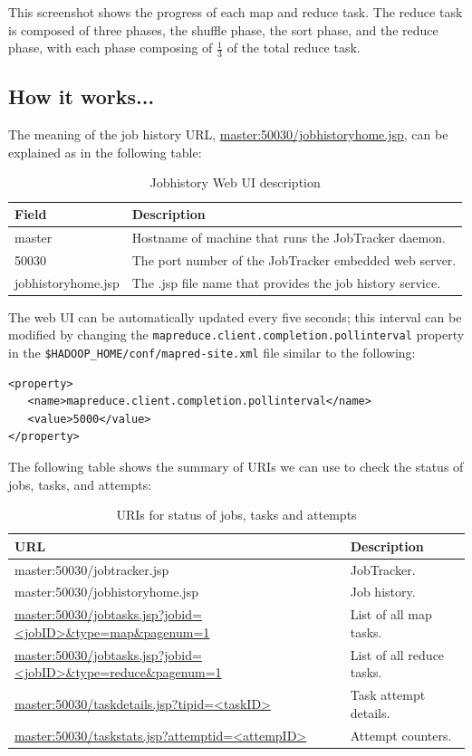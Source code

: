 This screenshot shows the progress of each map and reduce task. The reduce task is composed of three phases, the shuffle phase, the sort phase, and the reduce phase, with each phase composing of $\frac{1}{3}$ of the total reduce task.

\subsection*{How it works...}
The meaning of the job history URL, \url{master:50030/jobhistoryhome.jsp}, can be explained as in the following table:
\begin{table}
  \centering
  \begin{tabular}{ll}
    \toprule 
    \textbf{Field} & \textbf{Description} \\  \midrule
    master & Hostname of machine that runs the JobTracker daemon. \\
    50030 & The port number of the JobTracker embedded web server. \\
    jobhistoryhome.jsp & The .jsp file name that provides the job history service. \\ \bottomrule
  \end{tabular}
  \caption{Jobhistory Web UI description}\label{tbl:jobhistory}
\end{table}

The web UI can be automatically updated every five seconds; this interval can be modified by changing the \verb|mapreduce.client.completion.pollinterval| property in the \verb|$HADOOP_HOME/conf/mapred-site.xml| file similar to the following:
\lstset{style=bashstyle}
\begin{lstlisting}
<property>
   <name>mapreduce.client.completion.pollinterval</name>
   <value>5000</value>
</property>
\end{lstlisting}

The following table shows the summary of URIs we can use to check the status of jobs, tasks, and attempts:
\begin{table}
  \scriptsize
  \centering
  \begin{tabular}{ll}
    \toprule 
    \textbf{URL} & \textbf{Description} \\ \midrule
    master:50030/jobtracker.jsp & JobTracker.\\
    master:50030/jobhistoryhome.jsp & Job history. \\
    \url{master:50030/jobtasks.jsp?jobid=<jobID>&type=map&pagenum=1} & List of all map tasks. \\
    \url{master:50030/jobtasks.jsp?jobid=<jobID>&type=reduce&pagenum=1} & List of all reduce tasks. \\
    \url{master:50030/taskdetails.jsp?tipid=<taskID>} & Task attempt details. \\
    \url{master:50030/taskstats.jsp?attemptid=<attempID>} & Attempt counters. \\ \bottomrule
  \end{tabular}
  \caption{URIs for status of jobs, tasks and attempts}\label{tbl:statusuris}
\end{table}

